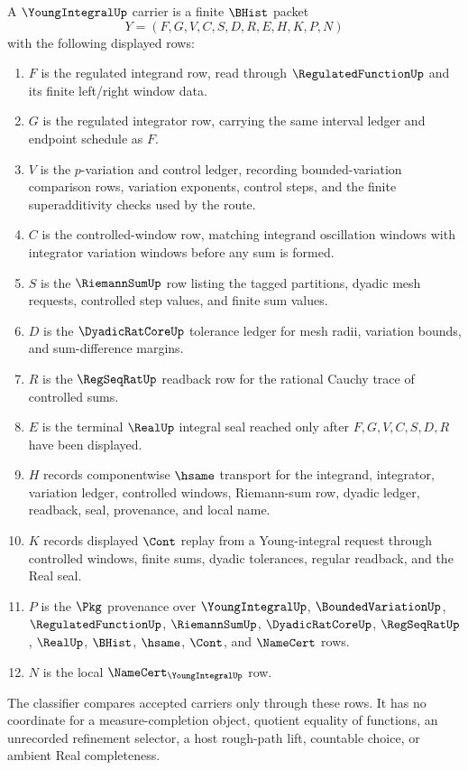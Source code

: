 \begin{definition}
\label{def:young-integral-carrier}
A $\YoungIntegralUp$ carrier is a finite $\BHist$ packet
$$
Y=(F,G,V,C,S,D,R,E,H,K,P,N)
$$
with the following displayed rows:
\begin{enumerate}
\item $F$ is the regulated integrand row, read through $\RegulatedFunctionUp$ and its finite left/right window data.
\item $G$ is the regulated integrator row, carrying the same interval ledger and endpoint schedule as $F$.
\item $V$ is the $p$-variation and control ledger, recording bounded-variation comparison rows, variation exponents, control steps, and the finite superadditivity checks used by the route.
\item $C$ is the controlled-window row, matching integrand oscillation windows with integrator variation windows before any sum is formed.
\item $S$ is the $\RiemannSumUp$ row listing the tagged partitions, dyadic mesh requests, controlled step values, and finite sum values.
\item $D$ is the $\DyadicRatCoreUp$ tolerance ledger for mesh radii, variation bounds, and sum-difference margins.
\item $R$ is the $\RegSeqRatUp$ readback row for the rational Cauchy trace of controlled sums.
\item $E$ is the terminal $\RealUp$ integral seal reached only after $F,G,V,C,S,D,R$ have been displayed.
\item $H$ records componentwise $\hsame$ transport for the integrand, integrator, variation ledger, controlled windows, Riemann-sum row, dyadic ledger, readback, seal, provenance, and local name.
\item $K$ records displayed $\Cont$ replay from a Young-integral request through controlled windows, finite sums, dyadic tolerances, regular readback, and the Real seal.
\item $P$ is the $\Pkg$ provenance over $\YoungIntegralUp$, $\BoundedVariationUp$, $\RegulatedFunctionUp$, $\RiemannSumUp$, $\DyadicRatCoreUp$, $\RegSeqRatUp$, $\RealUp$, $\BHist$, $\hsame$, $\Cont$, and $\NameCert$ rows.
\item $N$ is the local $\NameCert_{\YoungIntegralUp}$ row.
\end{enumerate}
The classifier compares accepted carriers only through these rows. It has no coordinate for a measure-completion object, quotient equality of functions, an unrecorded refinement selector, a host rough-path lift, countable choice, or ambient Real completeness.
\end{definition}

